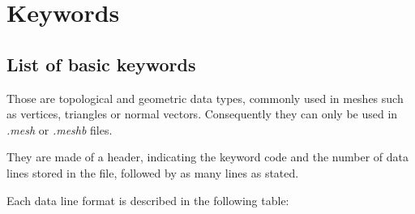\documentclass[a4paper,12pt]{article}
\begin{document}
%
%

\newpage
\section{Keywords}
\label{keywords}

\subsection{List of basic keywords}

Those are topological and geometric data types, commonly used in meshes such as vertices, triangles or normal vectors. Consequently they can only be used in \emph{.mesh} or \emph{.meshb} files.

They are made of a header, indicating the keyword code and the number of data lines stored in the file, followed by as many lines as stated.

Each data line format is described in the following table:
\end{document}
